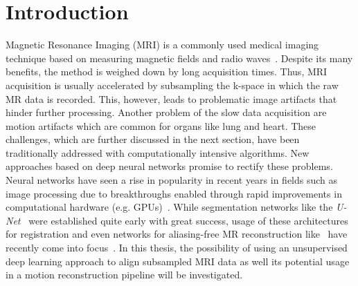 
\chapter{Introduction} \label{Ch:Introduction}
Magnetic Resonance Imaging (MRI) is a commonly used medical imaging technique based on measuring magnetic fields and radio waves~\cite{Brown2014,Serai2021,Singh2023}. 
Despite its many benefits, the method is weighed down by long acquisition times.
Thus, MRI acquisition is usually accelerated by subsampling the k-space in which the raw MR data is recorded. This, however, leads to problematic image artifacts that hinder further processing. Another problem of the slow data acquisition are motion artifacts which are common for organs like lung and heart. 
These challenges, which are further discussed in the next section, have been traditionally addressed with computationally intensive algorithms.
New approaches based on deep neural networks promise to rectify these problems. Neural networks have seen a rise in popularity in recent years in fields such as image processing due to breakthroughs enabled through rapid improvements in computational hardware (e.g. GPUs)~\cite{Chen2020}. While segmentation networks like the \emph{U-Net}~\cite{U-Net} were established quite early with great success, usage of these architectures for registration and even networks for aliasing-free MR reconstruction like~\cite{Kuestner2022,Ghoul2024,Pan2024} have recently come into focus~\cite{Chen2020,Haskins2020}. %
In this thesis, the possibility of using an unsupervised deep learning approach to align subsampled MRI data as well its potential usage in a motion reconstruction pipeline will be investigated.
